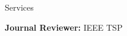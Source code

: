 
\begin{rSection}{Services}
    
     \small{{\bf Journal Reviewer:} IEEE TSP  


}
    \end{rSection}